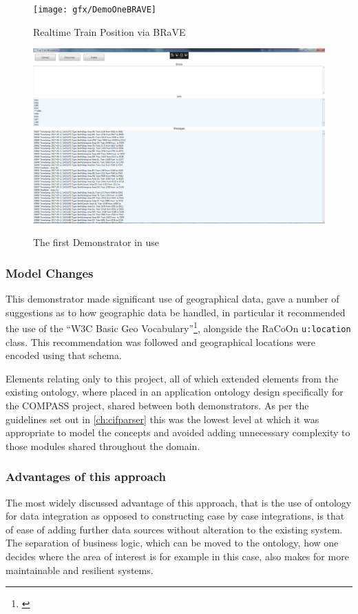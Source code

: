 \begin{figure}
\myfloatalign
{\texttt{[image: gfx/DemoOneBRAVE]}} 
\caption[Realtime Train Position via BRaVE]{Realtime Train Position via BRaVE \citep{Wen2015}}
\label{fig:DemoOneBrave}
\end{figure}

\begin{figure}[h]
\myfloatalign
{\includegraphics[width=\linewidth]{gfx/DemoOneScreenShot}} 
\caption[Demonstrator One]{The first Demonstrator in use}
\label{fig:DemoOne}
\end{figure}


\subsubsection{Model Changes}
This demonstrator made significant use of geographical data, \citet{Tutcher2015} gave a number of suggestions as to how geographic data be handled, in particular it recommended the use of the ``W3C Basic Geo Vocabulary''\footnote{\cite{Lieberman2007}}, alongside the RaCoOn \texttt{u:location} class. This recommendation was followed and geographical locations were encoded using that schema. 

Elements relating only to this project, all of which extended elements from the existing ontology, where placed in an application ontology design specifically for the COMPASS project, shared between both demonstrators. As per the guidelines set out in \autoref{ch:cifparser} this was the lowest level at which it was appropriate to model the concepts and avoided adding unnecessary complexity to those modules shared throughout the domain.

\subsubsection{Advantages of this approach}
The most widely discussed advantage of this approach, that is the use of ontology for data integration as opposed to constructing case by case integrations, is that of ease of adding further data sources without alteration to the existing system. The separation of business logic, which can be moved to the ontology, how one decides where the area of interest is for example in this case, also makes for more maintainable and resilient systems. 

